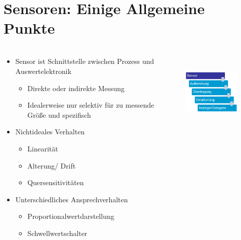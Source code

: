 \section{Sensoren: Einige Allgemeine Punkte}
\begin{frame}
\frametitle{\insertsection}   
\vfill
\begin{columns}
    \begin{column}[c]{0.5\textwidth}
        \begin{itemize}
            \item Sensor ist Schnittstelle zwischen Prozess und Auswertelektronik
            \begin{itemize}
                \item Direkte oder indirekte Messung
                \item Idealerweise nur selektiv für zu messende Größe und spezifisch\\
            \end{itemize}
            \item Nichtideales Verhalten
            \begin{itemize}
                \item Linearität
                \item Alterung/ Drift
                \item Quersensitivitäten\\
            \end{itemize}
            \item Unterschiedliches Ansprechverhalten
            \begin{itemize}
                \item Proportionalwertdarstellung
                \item Schwellwertschalter
            \end{itemize}
        \end{itemize}
       
    \end{column}
    \begin{column}[c]{0.5\textwidth}
        \begin{figure}
            \centerline{\includegraphics[height=10em]{Abbildung02.png}}
        \end{figure}
    \end{column}
\end{columns}
\end{frame}

